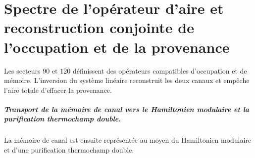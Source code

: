 \chapter{Spectre de l’opérateur d’aire et reconstruction conjointe de l’occupation et de la provenance}
\label{chap:parte-iv-59}

Les secteurs \(90\) et \(120\) définissent des opérateurs compatibles d’occupation et de mémoire. L’inversion du système linéaire reconstruit les deux canaux et empêche l’aire totale d’effacer la provenance.



\paragraph{Transport de la mémoire de canal vers le Hamiltonien modulaire et la purification thermochamp double.} La mémoire de canal est ensuite représentée au moyen du Hamiltonien modulaire et d’une purification thermochamp double.

